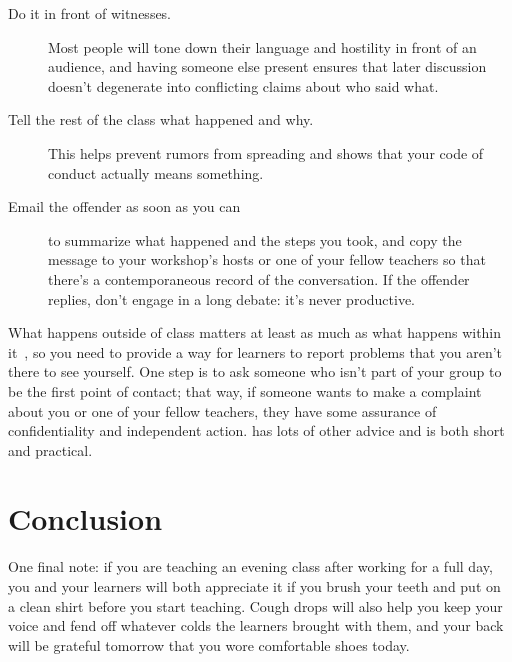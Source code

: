 \documentclass[10pt,letterpaper]{article}
\begin{document}
\begin{description}

\item[Do it in front of witnesses.]
  Most people will tone down their language and hostility in front of an audience,
  and having someone else present ensures that
  later discussion doesn't degenerate into conflicting claims about who said what.

\item[Tell the rest of the class what happened and why.]
  This helps prevent rumors from spreading
  and shows that your code of conduct actually means something.

\item[Email the offender as soon as you can]
  to summarize what happened and the steps you took,
  and copy the message to your workshop's hosts or one of your fellow teachers
  so that there's a contemporaneous record of the conversation.
  If the offender replies,
  don't engage in a long debate:
  it's never productive.

\end{description}

What happens outside of class matters at least as much as what happens within it~\cite{Part2011},
so you need to provide a way for learners to report problems that you aren't there to see yourself.
One step is to ask someone who isn't part of your group to be the first point of contact;
that way,
if someone wants to make a complaint about you or one of your fellow teachers,
they have some assurance of confidentiality and independent action.
\cite{Auro2019} has lots of other advice
and is both short and practical.

\section*{Conclusion}

One final note:
if you are teaching an evening class after working for a full day,
you and your learners will both appreciate it if you brush your teeth and put on a clean shirt
before you start teaching.
Cough drops will also help you keep your voice
and fend off whatever colds the learners brought with them,
and your back will be grateful tomorrow that you wore comfortable shoes today.


\end{document}
